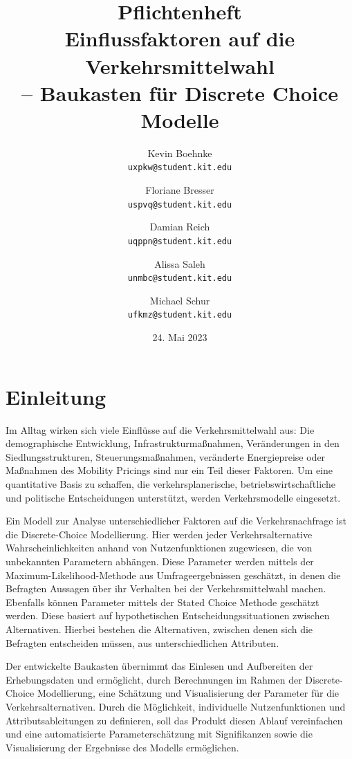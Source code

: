 \documentclass{article}
\title{Pflichtenheft \\ \large Einflussfaktoren auf die Verkehrsmittelwahl\\ -- Baukasten für Discrete Choice Modelle}
\author{Kevin Boehnke \\ \texttt{uxpkw@student.kit.edu}
\and Floriane Bresser \\ \texttt{uspvq@student.kit.edu}
\and Damian Reich \\ \texttt{uqppn@student.kit.edu}
\and Alissa Saleh \\ \texttt{unmbc@student.kit.edu}
\and Michael Schur \\ \texttt{ufkmz@student.kit.edu}}
\date{24. Mai 2023}
\begin{document}
\clearpage\maketitle\thispagestyle{empty}
\newpage
\clearpage\tableofcontents\thispagestyle{empty}
\newpage
{}

\section{Einleitung}

Im Alltag wirken sich viele Einflüsse auf die Verkehrsmittelwahl aus: Die demographische Entwicklung, Infrastrukturmaßnahmen, Veränderungen in den Siedlungsstrukturen, Steuerungsmaßnahmen, veränderte Energiepreise oder Maßnahmen des Mobility Pricings sind nur ein Teil dieser Faktoren. Um eine quantitative Basis zu schaffen, die verkehrsplanerische, betriebswirtschaftliche und politische Entscheidungen unterstützt, werden Verkehrsmodelle eingesetzt.\newline

Ein Modell zur Analyse unterschiedlicher Faktoren auf die Verkehrsnachfrage ist die Discrete-Choice Modellierung. Hier werden jeder Verkehrsalternative Wahrscheinlichkeiten anhand von Nutzenfunktionen zugewiesen, die von unbekannten Parametern abhängen. Diese Parameter werden mittels der Maximum-Likelihood-Methode aus Umfrageergebnissen geschätzt, in denen die Befragten Aussagen über ihr Verhalten bei der Verkehrsmittelwahl machen. Ebenfalls können Parameter mittels der Stated Choice Methode geschätzt werden. Diese basiert auf hypothetischen Entscheidungssituationen zwischen Alternativen. Hierbei bestehen die Alternativen, zwischen denen sich die Befragten entscheiden müssen, aus unterschiedlichen Attributen. %
\newline

Der entwickelte Baukasten übernimmt das Einlesen und Aufbereiten der Erhebungsdaten und ermöglicht, durch Berechnungen im Rahmen der Discrete-Choice Modellierung, eine Schätzung und Visualisierung der Parameter für die Verkehrsalternativen. Durch die Möglichkeit, individuelle Nutzenfunktionen und Attributsableitungen zu definieren, soll das Produkt diesen Ablauf vereinfachen und eine automatisierte Parameterschätzung mit Signifikanzen sowie die Visualisierung der Ergebnisse des Modells ermöglichen. 
\end{document}
